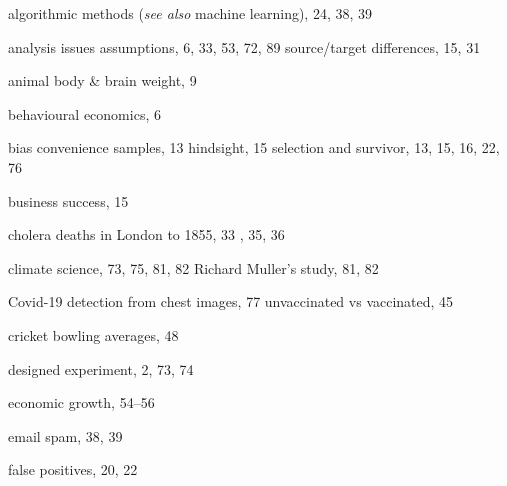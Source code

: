 \documentclass[
  10ptls,
  b5paper]{book}
\begin{document}
\newpage

\begin{theindex}

  \item algorithmic methods (\textit{see also} machine learning), 24, 
        38, 39
  \item analysis issues
    \subitem assumptions, 6, 33, 53, 72, 89
    \subitem source/target differences, 15, 31
  \item animal body \& brain weight, 9

  \indexspace

  \item behavioural economics, 6
  \item bias
    \subitem convenience samples, 13
    \subitem hindsight, 15
    \subitem selection and survivor, 13, 15, 16, 22, 76
  \item business success, 15

  \indexspace

  \item cholera deaths in London
     to 1855, 33
    , 35, 36
  \item climate science, 73, 75, 81, 82
    \subitem Richard Muller's study, 81, 82
  \item Covid-19
    \subitem detection from chest images, 77
    \subitem unvaccinated vs vaccinated, 45
  \item cricket bowling averages, 48

  \indexspace

  \item designed experiment, 2, 73, 74

  \indexspace

  \item economic growth, 54--56
  \item email spam, 38, 39

  \indexspace

  \item false positives, 20, 22

  \indexspace


\end{theindex}
\end{document}
